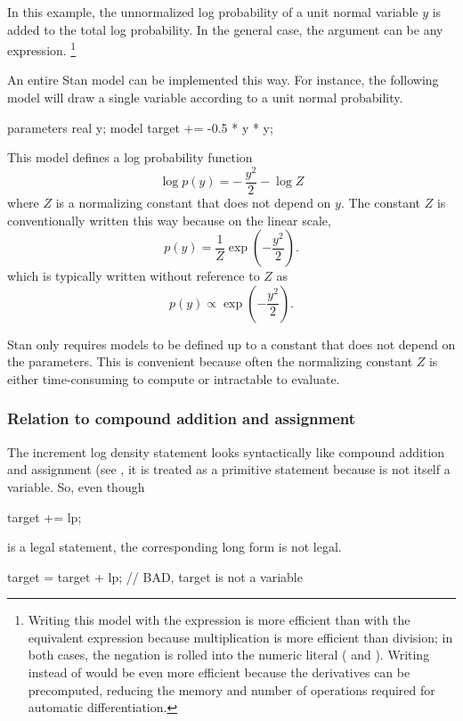In this example, the unnormalized log probability of a unit normal
variable $y$ is added to the total log probability.  In the general
case, the argument can be any expression.%
%
\footnote{Writing this model with the expression 
  is more efficient than with the equivalent expression  because multiplication is more efficient than division; in
  both cases, the negation is rolled into the numeric literal
  ( and ).  Writing  instead of
   would be even more efficient because the derivatives
  can be precomputed, reducing the memory and number of operations
  required for automatic differentiation.}

An entire Stan model can be implemented this way.  For instance, the
following model will draw a single variable according to a unit normal
probability.
%
\begin{stancode}
parameters {
  real y;
}
model {
  target += -0.5 * y * y;
}
\end{stancode}
%
This model defines a log probability function
%
\[
\log p(y) = - \, \frac{y^2}{2} - \log Z
\]
%
where $Z$ is a normalizing constant that does not depend on $y$.  The
constant $Z$ is conventionally written this way because on the linear
scale,
\[
p(y) = \frac{1}{Z} \exp\left(-\frac{y^2}{2}\right).
\]
which is typically written without reference to $Z$ as
\[
p(y) \propto \exp\left(-\frac{y^2}{2}\right).
\]

Stan only requires models to be defined up to a constant that does not
depend on the parameters.  This is convenient because often the
normalizing constant $Z$ is either time-consuming to compute or
intractable to evaluate.

\subsubsection{Relation to compound addition and assignment}

The increment log density statement looks syntactically like compound
addition and assignment (see
, it is treated as a
primitive statement because  is not itself a variable.
So, even though
%
\begin{stancode}
target += lp;
\end{stancode}
%
is a legal statement, the corresponding long form is not legal.
%
\begin{stancode}
target = target + lp;  // BAD, target is not a variable
\end{stancode}


